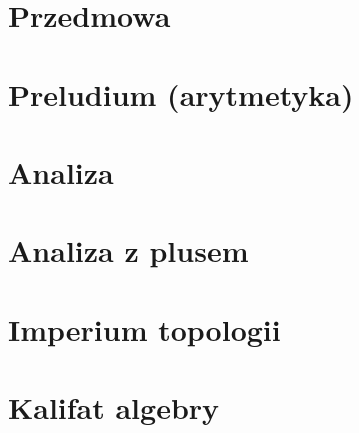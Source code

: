 \tableofcontents
\newpage

\chapter*{Przedmowa}

\newpage

\chapter{Preludium (arytmetyka)}

\chapter{Analiza}




 

 

\chapter{Analiza z plusem}






 
  
 
  

\chapter{Imperium topologii}
   
   
   
 
  

\chapter{Kalifat algebry}
  
  
  
  
  
  



